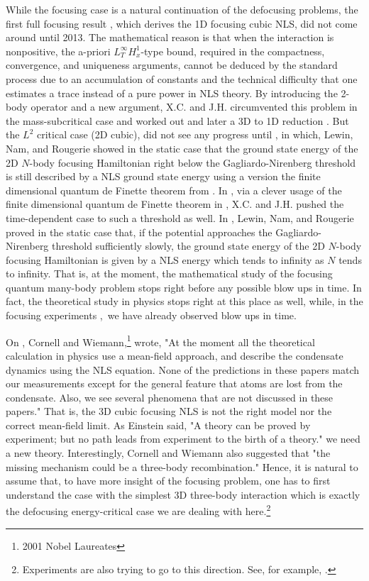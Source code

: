\documentclass[12pt,letterpaper,leqno]{amsart}
\theoremstyle{plain}
\numberwithin{equation}{section}
\numberwithin{theorem}{section}
\numberwithin{proposition}{section}
\numberwithin{lemma}{section}
\numberwithin{corollary}{section}
\begin{document}
While the focusing case is a natural continuation of the defocusing
problems, the first full focusing result \cite{C-HFocusing}, which derives
the 1D focusing cubic NLS, did not come around until 2013. The mathematical
reason is that when the interaction is nonpositive, the a-priori $%
L_{T}^{\infty }H_{x}^{1}$-type bound, required in the compactness,
convergence, and uniqueness arguments, cannot be deduced by the standard
process due to an accumulation of constants and the technical difficulty
that one estimates a trace instead of a pure power in NLS theory. By
introducing the 2-body operator and a new argument, X.C. and J.H.
circumvented this problem in the mass-subcritical case and worked out \cite%
{C-HFocusing} and later a 3D to 1D reduction \cite{C-HFocusingII}. But the $%
L^{2}$ critical case (2D cubic), did not see any progress until \cite%
{LewinFocusing}, in which, Lewin, Nam, and Rougerie showed in the static
case that the ground state energy of the 2D $N$-body focusing Hamiltonian
right below the Gagliardo-Nirenberg threshold is still described by a NLS
ground state energy using a version the finite dimensional quantum de
Finette theorem from \cite{OriginalDeFinette}. In \cite{C-HFocusingIII}, via
a clever usage of the finite dimensional quantum de Finette theorem in \cite%
{LewinFocusing}, X.C. and J.H. pushed the time-dependent case to such a
threshold as well. In \cite{LNR2018}, Lewin, Nam, and Rougerie proved in the
static case that, if the potential approaches the Gagliardo-Nirenberg
threshold sufficiently slowly, the ground state energy of the 2D $N$-body
focusing Hamiltonian is given by a NLS energy which tends to infinity as $N$
tends to infinity. That is, at the moment, the mathematical study of the
focusing quantum many-body problem stops right before any possible blow ups
in time. In fact, the theoretical study in physics stops right at this place
as well, while, in the focusing experiments \cite{Cornish,JILA2},\ we have
already observed blow ups in time.

On \cite[p.4-5]{JILA2}, Cornell and Wiemann,\footnote{%
2001 Nobel Laureates} wrote, "At the moment all the theoretical calculation
in physics use a mean-field approach, and describe the condensate dynamics
using the NLS equation. None of the predictions in these papers match our
measurements except for the general feature that atoms are lost from the
condensate. Also, we see several phenomena that are not discussed in these
papers." That is, the 3D cubic focusing NLS is not the right model nor the
correct mean-field limit. As Einstein said, "A theory can be proved by
experiment; but no path leads from experiment to the birth of a theory." we
need a new theory. Interestingly, Cornell and Wiemann also suggested that
"the missing mechanism could be a three-body recombination." Hence, it is
natural to assume that, to have more insight of the focusing problem, one
has to first understand the case with the simplest 3D three-body interaction
which is exactly the defocusing energy-critical case we are dealing with
here.\footnote{%
Experiments are also trying to go to this direction. See, for example, \cite%
{3-body Experiment}.}
\end{document}
